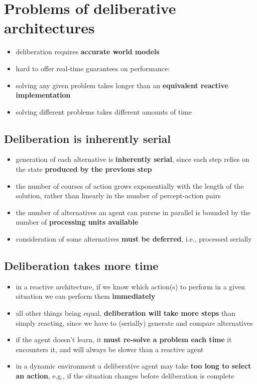 \documentclass{article}
\begin{document}
\tableofcontents

\newpage

\section{Problems of deliberative architectures}
\begin{itemize}
  \item deliberation requires \textbf{accurate world models} 
  \item hard to offer real-time guarantees on performance:
  \item solving any given problem takes longer than an \textbf{equivalent reactive implementation} 
  \item solving different problems takes different amounts of time
\end{itemize}

\subsection{Deliberation is inherently serial}
\begin{itemize}
  \item generation of each alternative is \textbf{inherently serial}, since each step relies on the state \textbf{produced by the previous step} 
  \item the number of courses of action grows exponentially with the length of the solution, rather than linearly in the number of percept-action pairs 
  \item the number of alternatives an agent can pursue in parallel is bounded by the number of \textbf{processing units available }
  \item consideration of some alternatives \textbf{must be deferred}, i.e., processed serially
\end{itemize}

\subsection{Deliberation takes more time}
\begin{itemize}
  \item in a reactive architecture, if we know which action(s) to perform in a given situation we can perform them \textbf{immediately} 
  \item all other things being equal, \textbf{deliberation will take more steps} than simply reacting, since we have to (serially) generate and compare alternatives 
  \item if the agent doesn’t learn, it \textbf{must re-solve a problem each time} it encounters it, and will always be slower than a reactive agent 
  \item in a dynamic environment a deliberative agent may take \textbf{too long to select an action}, e.g., if the situation changes before deliberation is complete
\end{itemize}
\end{document}
